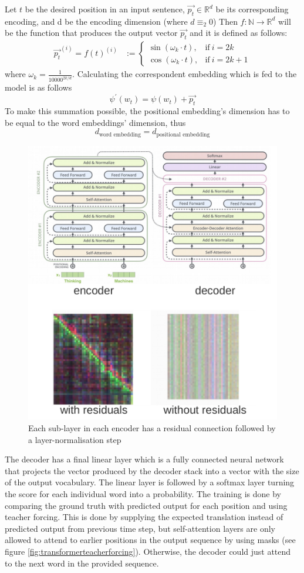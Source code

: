 \documentclass[11pt]{article}
\begin{document}
Let $t$ be the desired position in an input sentence, $\vec{p_t} \in \mathbb{R}^d$ be its corresponding encoding, and d be the encoding dimension (where $d \equiv_2 0$) Then $f:\mathbb{N}\rightarrow\mathbb{R}^d$ will be the function that produces the output vector $\vec{p_t}$ and it is defined as follows:
\begin{align*}
	\vec{p_t}^{(i)} = f(t)^{(i)} & := 
	\begin{cases}
		\sin({\omega_k} \cdot t),  & \text{if}\  i = 2k \\
		\cos({\omega_k} \cdot t),  & \text{if}\  i = 2k + 1
	\end{cases}
\end{align*}
where $\omega_k = \frac{1}{10000^{2k / d}}$. Calculating the correspondent embedding which is fed to the model is as follows
\begin{equation*}
	\psi^\prime(w_t) = \psi(w_t) + \vec{p_t}
\end{equation*}
To make this summation possible, the positional embedding’s dimension has to be equal to the word embeddings’ dimension, thus
\begin{equation*}
	d_{\text{word embedding}} = d_{\text{positional embedding}}
\end{equation*}

\begin{figure}[tbh]
	\centering
	\includegraphics[width=0.5\linewidth]{img/transformer_attention_residuals}
	\caption{Each sub-layer in each encoder has a residual connection followed by a layer-normalisation step}
	\label{fig:transformerattentionresiduals}
\end{figure}

The decoder has a final linear layer which is  a fully connected neural network that projects the vector produced by the decoder stack into a vector with the size of the output vocabulary. The linear layer is followed by a softmax layer turning the score for each individual word into a probability. The training is done by comparing the ground truth with predicted output for each position and using teacher forcing. This is done by supplying the expected translation instead of predicted output from previous time step, but self-attention layers are only allowed to attend to earlier positions in the output sequence by using masks (see figure \ref{fig:transformerteacherforcing}). Otherwise, the decoder could just attend to the next word in the provided sequence.
\end{document}

